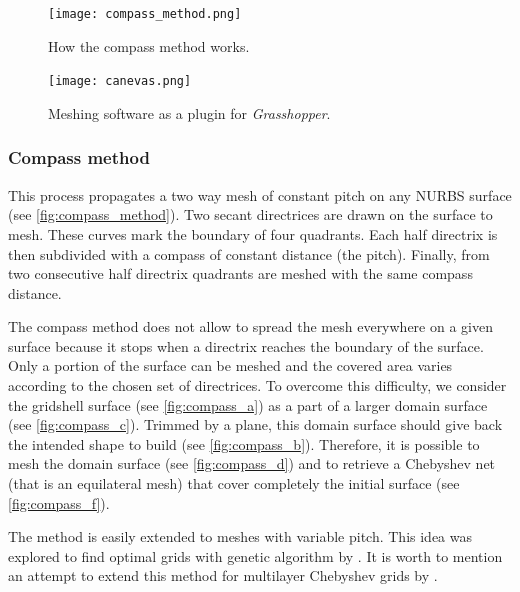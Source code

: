\begin{figure}[t]
     	\centering
		\texttt{[image: compass\_method.png]}
		\caption[How the compass method works]{How the compass method works.}
		\label{fig:compass_method}
		\vspace{0.75cm}
		\texttt{[image: canevas.png]}
		\caption{Meshing software as a plugin for \emph{Grasshopper}.}
		\label{fig:canevas}
\end{figure}


\subsubsection{Compass method}\label{sec=compass}
This process propagates a two way mesh of constant pitch on any NURBS surface (see \cref{fig:compass_method}). Two secant directrices are drawn on the surface to mesh. These curves mark the boundary of four quadrants. Each half directrix is then subdivided with a compass of constant distance (the pitch). Finally, from two consecutive half directrix quadrants are meshed with the same compass distance.

The compass method does not allow to spread the mesh everywhere on a given surface because it stops when a directrix reaches the boundary of the surface. Only a portion of the surface can be meshed and the covered area varies according to the chosen set of directrices. To overcome this difficulty, we consider the gridshell surface (see \cref{fig:compass_a}) as a part of a larger domain surface (see \cref{fig:compass_c}). Trimmed by a plane, this domain surface should give back the intended shape to build (see \cref{fig:compass_b}). Therefore, it is possible to mesh the domain surface (see \cref{fig:compass_d}) and to retrieve a Chebyshev net (that is an equilateral mesh) that cover completely the initial surface (see \cref{fig:compass_f}).

The method is easily extended to meshes with variable pitch. This idea was explored to find optimal grids with genetic algorithm by \citet{Bouhaya2014}. It is worth to mention an attempt to extend this method for multilayer Chebyshev grids by \citet{Lefevre2015}.

